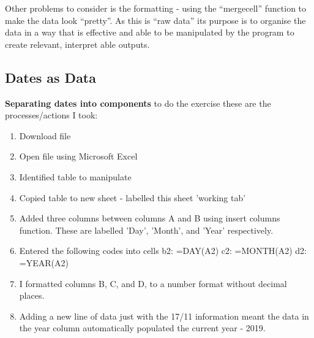 \documentclass{article}
\begin{document}
Other problems to consider is the formatting - using the ``mergecell'' function to make the data look ``pretty''.
As this is ``raw data'' its purpose is to organise the data in a way that is effective and able to be manipulated by the program to create relevant, interpret able outputs. 

\subsection{Dates as Data}
\textbf{Separating dates into components}
to do the exercise these are the processes/actions I took:
\begin{enumerate}
    \item Download file
    \item Open file using Microsoft Excel
    \item Identified table to manipulate
    \item Copied table to new sheet - labelled this sheet 'working tab'
    \item Added three columns between columns A and B using insert columns function. These are labelled 'Day', 'Month', and 'Year' respectively.
    \item Entered the following codes into cells b2: =DAY(A2) c2: =MONTH(A2) d2: =YEAR(A2)
    \item I formatted columns B, C, and D, to a number format without decimal places. 
    \item Adding a new line of data just with the 17/11 information meant the data in the year column automatically populated the current year - 2019. 
\end{enumerate}
\end{document}
